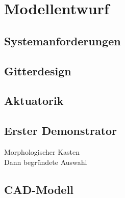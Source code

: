 \chapter{Modellentwurf}

\section{Systemanforderungen}

\section{Gitterdesign}

\section{Aktuatorik}

\section{Erster Demonstrator}
Morphologischer Kasten\\
Dann begründete Auswahl

\section{CAD-Modell}
